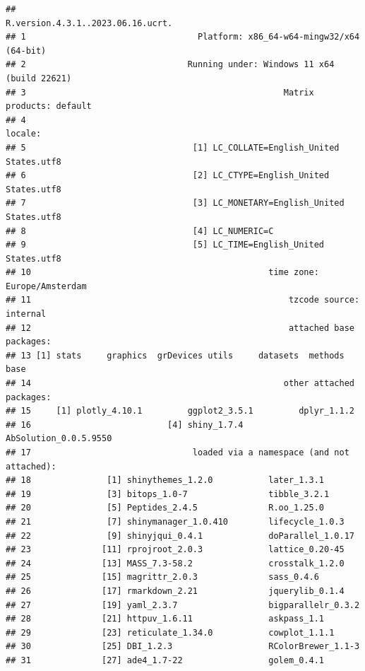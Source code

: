 \documentclass[
]{article}
\begin{document}
\begin{verbatim}
##                                            R.version.4.3.1..2023.06.16.ucrt.
## 1                                  Platform: x86_64-w64-mingw32/x64 (64-bit)
## 2                                Running under: Windows 11 x64 (build 22621)
## 3                                                   Matrix products: default
## 4                                                                    locale:
## 5                                 [1] LC_COLLATE=English_United States.utf8 
## 6                                 [2] LC_CTYPE=English_United States.utf8   
## 7                                 [3] LC_MONETARY=English_United States.utf8
## 8                                 [4] LC_NUMERIC=C                          
## 9                                 [5] LC_TIME=English_United States.utf8    
## 10                                               time zone: Europe/Amsterdam
## 11                                                   tzcode source: internal
## 12                                                   attached base packages:
## 13 [1] stats     graphics  grDevices utils     datasets  methods   base     
## 14                                                  other attached packages:
## 15     [1] plotly_4.10.1         ggplot2_3.5.1         dplyr_1.1.2          
## 16                           [4] shiny_1.7.4           AbSolution_0.0.5.9550
## 17                                loaded via a namespace (and not attached):
## 18               [1] shinythemes_1.2.0           later_1.3.1                
## 19               [3] bitops_1.0-7                tibble_3.2.1               
## 20               [5] Peptides_2.4.5              R.oo_1.25.0                
## 21               [7] shinymanager_1.0.410        lifecycle_1.0.3            
## 22               [9] shinyjqui_0.4.1             doParallel_1.0.17          
## 23              [11] rprojroot_2.0.3             lattice_0.20-45            
## 24              [13] MASS_7.3-58.2               crosstalk_1.2.0            
## 25              [15] magrittr_2.0.3              sass_0.4.6                 
## 26              [17] rmarkdown_2.21              jquerylib_0.1.4            
## 27              [19] yaml_2.3.7                  bigparallelr_0.3.2         
## 28              [21] httpuv_1.6.11               askpass_1.1                
## 29              [23] reticulate_1.34.0           cowplot_1.1.1              
## 30              [25] DBI_1.2.3                   RColorBrewer_1.1-3         
## 31              [27] ade4_1.7-22                 golem_0.4.1                

\end{verbatim}
\end{document}
